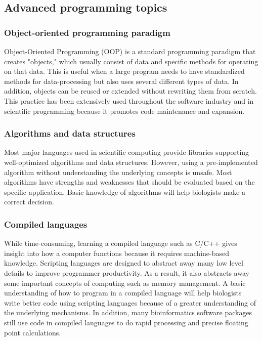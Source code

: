 \documentclass[ChapterTOCs,krantz2]{krantz} %
\begin{document}
\subsection{Advanced programming topics}

\subsubsection{Object-oriented programming paradigm}

Object-Oriented Programming (OOP) is a standard programming paradigm that
creates "objects," which usually consist of data 
and specific methods for operating on that data. This is useful when a large program 
needs to have standardized methods for data-processing but also uses 
several different types of data.
In addition, objects can be reused or extended without rewriting them from scratch.
This practice has been extensively used throughout the software industry and 
in scientific programming because it promotes code maintenance and expansion.

\subsubsection{Algorithms and data structures}

Most major languages used in
scientific computing provide libraries supporting well-optimized algorithms and
data structures. However, using a
pre-implemented algorithm without understanding the underlying concepts is
unsafe. Most algorithms have strengths and weaknesses that should be 
evaluated based on the specific application. Basic knowledge of algorithms 
will help biologists make a correct decision.

\subsubsection{Compiled languages}

While time-consuming, learning a compiled language such as C/C++
gives insight into how a computer functions because it requires 
machine-based knowledge. Scripting languages are designed to abstract away many low level
details to improve programmer productivity. As a result, it also abstracts away
some important concepts of computing such as memory management. A basic
understanding of how to program in a compiled language will help biologists
write better code using scripting languages because of a greater understanding
of the underlying mechanisms. In addition, many bioinformatics software
packages still use code in compiled languages to do rapid
processing and precise floating point calculations.  
\end{document}
